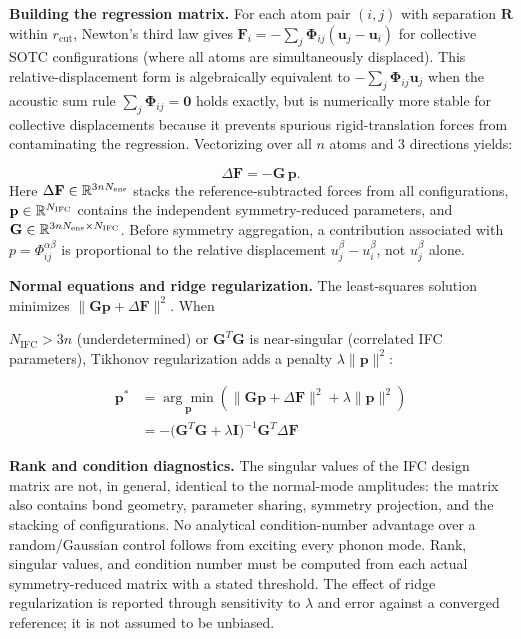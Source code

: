 \documentclass[aps,prb,reprint,amsmath,amssymb,floatfix]{revtex4-2}
\begin{document}
\textbf{Building the regression matrix.} For each atom pair \((i,j)\)
with separation \(\mathbf{R}\) within \(r_\text{cut}\), Newton's third
law gives
\(\mathbf{F}_i = -\sum_{j}\boldsymbol{\Phi}_{ij}(\mathbf{u}_j - \mathbf{u}_i)\)
for collective SOTC configurations (where all atoms are simultaneously
displaced). This relative-displacement form is algebraically equivalent
to \(-\sum_j\boldsymbol{\Phi}_{ij}\mathbf{u}_j\) when the acoustic sum
rule \(\sum_j\boldsymbol{\Phi}_{ij} = \mathbf{0}\) holds exactly, but is
numerically more stable for collective displacements because it prevents
spurious rigid-translation forces from contaminating the regression.
Vectorizing over all \(n\) atoms and 3 directions yields:

\begin{equation*}
\Delta\mathbf F=-\mathbf G\,\mathbf p .
\end{equation*}
Here \(\Delta\mathbf F\in\mathbb R^{3nN_{\rm ens}}\) stacks the
reference-subtracted forces from all configurations,
\(\mathbf p\in\mathbb R^{N_{\rm IFC}}\) contains the independent
symmetry-reduced parameters, and
\(\mathbf G\in\mathbb R^{3nN_{\rm ens}\times N_{\rm IFC}}\). Before
symmetry aggregation, a contribution associated with
\(p=\Phi_{ij}^{\alpha\beta}\) is proportional to the relative displacement
\(u_j^\beta-u_i^\beta\), not \(u_j^\beta\) alone.

\textbf{Normal equations and ridge regularization.} The least-squares solution
minimizes \(\|\mathbf G\mathbf p+\Delta\mathbf F\|^2\). When

\(N_\text{IFC} > 3n\) (underdetermined) or \(\mathbf{G}^T\mathbf{G}\) is
near-singular (correlated IFC parameters), Tikhonov regularization adds
a penalty \(\lambda\|\mathbf{p}\|^2\):

\begin{align*}
\mathbf{p}^*
  &= \underset{\mathbf{p}}{\arg\min}\left(\|\mathbf{G}\mathbf{p}
      +\Delta\mathbf{F}\|^2+\lambda\|\mathbf{p}\|^2\right) \\
  &= -\bigl(\mathbf{G}^T\mathbf{G}+\lambda\mathbf{I}\bigr)^{-1}
      \mathbf{G}^T\Delta\mathbf{F}
\end{align*}

\textbf{Rank and condition diagnostics.} The singular values of the IFC design
matrix are not, in general, identical to the normal-mode amplitudes: the matrix
also contains bond geometry, parameter sharing, symmetry projection, and the
stacking of configurations. No analytical condition-number advantage over a
random/Gaussian control follows from exciting every phonon mode. Rank,
singular values, and condition number must be computed from each actual
symmetry-reduced matrix with a stated threshold. The effect of ridge
regularization is reported through sensitivity to \(\lambda\) and error against
a converged reference; it is not assumed to be unbiased.
\end{document}
